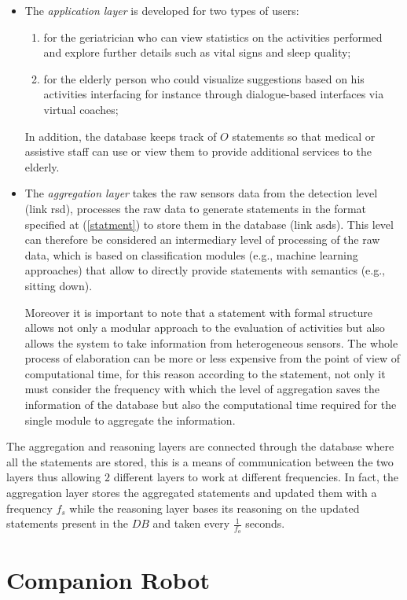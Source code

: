 \documentclass{thesisreport}
\begin{document}
\begin{itemize}
    \item The \textit{application layer} is developed for two types of users:
    \begin{enumerate}
        \item for the geriatrician who can view statistics on the activities performed and explore further details such as vital signs and sleep quality;
        \item for the elderly person who could visualize suggestions based on his activities interfacing for instance through dialogue-based interfaces via virtual coaches;
    \end{enumerate}
    In addition, the database keeps track of $O$ statements so that medical or assistive staff can use or view them to provide additional services to the elderly.
    \item The \textit{aggregation layer} takes the raw sensors data from the detection level (link rsd), processes the raw data to generate statements in the format specified at (\ref{statment}) to store them in the database (link asds). This level can therefore be considered an intermediary level of processing of the raw data, which is based on classification modules (e.g., machine learning approaches) that allow to directly provide statements with semantics (e.g., sitting down).
    
    Moreover it is important to note that a statement with formal structure allows not only a modular approach to the evaluation of activities but also allows the system to take information from heterogeneous sensors. The whole process of elaboration can be more or less expensive from the point of view of computational time, for this reason according to the statement, not only it must consider the frequency with which the level of aggregation saves the information of the database but also the computational time required for the single module to aggregate the information.
 \end{itemize}
 
  The aggregation and reasoning layers are connected through the database where all the statements are stored, this is a means of communication between the two layers thus allowing $2$ different layers to work at different frequencies. In fact, the aggregation layer stores the aggregated statements and updated them with a frequency $f_s$ while the reasoning layer bases its reasoning on the updated statements present in the $DB$ and taken every $\frac{1}{f_o}$ seconds.
 
 \section{Companion Robot}  \label{companionRobot}
 
\end{document}
